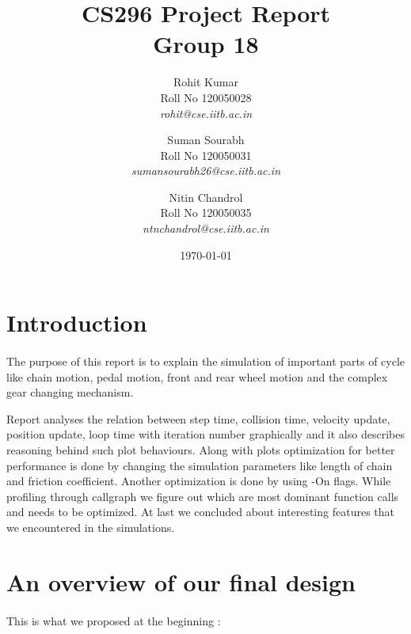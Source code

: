\documentclass[11pt]{article}
\begin{document}
\title{CS296 Project Report\\
		Group 18}
	
\author{Rohit Kumar \\
		\textup{Roll No 120050028} \\
		\textit{rohit@cse.iitb.ac.in}
		\and
		Suman Sourabh \\
		\textup{Roll No 120050031} \\
		\textit{sumansourabh26@cse.iitb.ac.in}
		\and
		Nitin Chandrol\\
		\textup{Roll No 120050035} \\
		\textit{ntnchandrol@cse.iitb.ac.in}
		}

\date{\today}

\maketitle
\section{Introduction}

	\paragraph{}
	The purpose of this report is to explain the simulation of important parts of cycle like chain motion, pedal motion, front and rear
	wheel motion and the complex gear changing mechanism.
	 
		Report analyses the relation between step time, collision time, velocity update, position update, loop time with iteration
	number graphically and it also describes reasoning behind such plot behaviours.	Along with plots optimization for better performance 
	is done by changing the simulation parameters like length of chain and friction
	coefficient. Another optimization is done by using -On flags. 
	While profiling through callgraph we figure out which are most dominant function calls and needs to be optimized. At last we concluded
	about interesting features that we encountered in the simulations.  
 
 
\section{An overview of our final design}

\paragraph{}
	This is what we proposed at the beginning :
\end{document}
